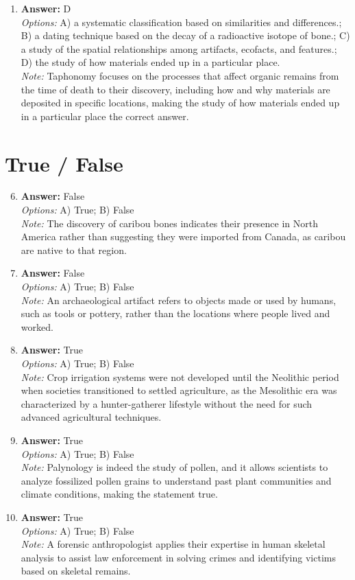 \documentclass[12pt]{article}
\begin{document}
\begin{enumerate}[label=\arabic*.]
\item \textbf{Answer:} D
\\ \textit{Options:} A) a systematic classification based on similarities and differences.; B) a dating technique based on the decay of a radioactive isotope of bone.; C) a study of the spatial relationships among artifacts, ecofacts, and features.; D) the study of how materials ended up in a particular place.
\\ \textit{Note:} Taphonomy focuses on the processes that affect organic remains from the time of death to their discovery, including how and why materials are deposited in specific locations, making the study of how materials ended up in a particular place the correct answer.
\end{enumerate}

\section*{True / False}
\begin{enumerate}[label=\arabic*.]
\setcounter{enumi}{5}
\item \textbf{Answer:} False
\\ \textit{Options:} A) True; B) False
\\ \textit{Note:} The discovery of caribou bones indicates their presence in North America rather than suggesting they were imported from Canada, as caribou are native to that region.
\item \textbf{Answer:} False
\\ \textit{Options:} A) True; B) False
\\ \textit{Note:} An archaeological artifact refers to objects made or used by humans, such as tools or pottery, rather than the locations where people lived and worked.
\item \textbf{Answer:} True
\\ \textit{Options:} A) True; B) False
\\ \textit{Note:} Crop irrigation systems were not developed until the Neolithic period when societies transitioned to settled agriculture, as the Mesolithic era was characterized by a hunter-gatherer lifestyle without the need for such advanced agricultural techniques.
\item \textbf{Answer:} True
\\ \textit{Options:} A) True; B) False
\\ \textit{Note:} Palynology is indeed the study of pollen, and it allows scientists to analyze fossilized pollen grains to understand past plant communities and climate conditions, making the statement true.
\item \textbf{Answer:} True
\\ \textit{Options:} A) True; B) False
\\ \textit{Note:} A forensic anthropologist applies their expertise in human skeletal analysis to assist law enforcement in solving crimes and identifying victims based on skeletal remains.
\end{enumerate}
\end{document}
